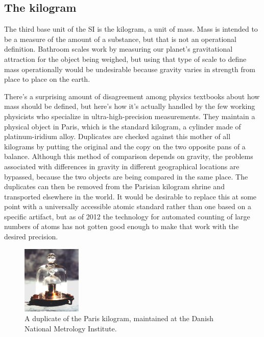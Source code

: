 

\subsection{The kilogram}


The third base unit of the SI is the kilogram,
a unit of mass.  Mass is intended to be a measure of the
amount of a substance, but that is not an operational
definition. Bathroom scales work by measuring our planet's
gravitational attraction for the object being weighed, but
using that type of scale to define mass operationally would
be undesirable because gravity varies in strength from place
to place on the earth.

There's a surprising amount of disagreement among physics
textbooks about how mass should be defined, but here's how
it's actually handled by the few working physicists who
specialize in ultra-high-precision measurements. They
maintain a physical object in Paris, which is the standard
kilogram, a cylinder made of platinum-iridium alloy.
Duplicates are checked against this mother of all kilograms
by putting the original and the copy on the two opposite
pans of a balance. Although this method of comparison
depends on gravity, the problems associated with differences
in gravity in different geographical locations are bypassed,
because the two objects are being compared in the same
place. The duplicates can then be removed from the Parisian
kilogram shrine and transported elsewhere in the world.
It would be desirable to replace this at some point with a
universally accessible atomic standard rather than one based on
a specific artifact, but as of 2012 the technology for automated counting
of large numbers of atoms has not gotten good
enough to make that work with the desired precision.

\begin{figure}
\begin{center}
\includegraphics[width=0.25\textwidth]{./introduction/figs/standard-kilogram}
\caption{ A duplicate of the Paris kilogram, maintained at the Danish National Metrology Institute.}
\end{center}
\end{figure}





